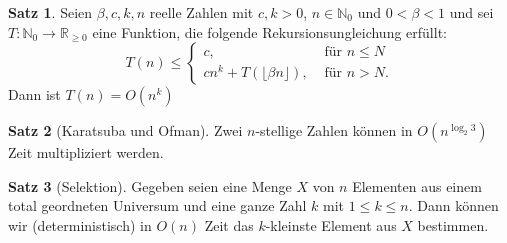 \documentclass[a4paper,10pt,landscape]{article}
\newcommand{\R}{\mathbb{R}}
\newcommand{\N}{\mathbb{N}}
\theoremstyle{definition}
\newtheorem*{satz}{Satz}
\theoremstyle{remark}
\begin{document}
\begin{multicols}{3}
\begin{satz}
  Seien $\beta, c, k, n$ reelle Zahlen mit $c, k > 0$, $n \in \N_0$ und $0 < \beta < 1$ und sei $T : \N_0 \to \R_{\geq 0}$ eine Funktion, die folgende Rekursionsungleichung erfüllt:
  \[ T(n) \leq \begin{cases}
    c, & \text{ für } n \leq N \\
    c n^k + T(\lfloor \beta n \rfloor), & \text{ für } n > N.
  \end{cases} \]
  Dann ist $T(n) = O(n^k)$
\end{satz}


\begin{satz}[Karatsuba und Ofman]
  Zwei $n$-stellige Zahlen können in $O(n^{\log_2 3})$ Zeit multipliziert werden.
\end{satz}


\begin{satz}[Selektion]
  Gegeben seien eine Menge $X$ von $n$ Elementen aus einem total geordneten Universum und eine ganze Zahl $k$ mit $1 \leq k \leq n$. Dann können wir (deterministisch) in $O(n)$ Zeit das $k$-kleinste Element aus $X$ bestimmen.
\end{satz}

\end{multicols}
\end{document}
